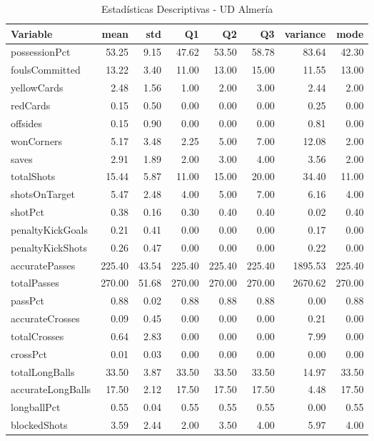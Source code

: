 \begin{table}[H]
\centering
\caption{Estadísticas Descriptivas - UD Almería}
\label{tab:esp_almeria}
\small
\begin{tabular}{lrrrrrrr}
\hline
Variable & mean & std & Q1 & Q2 & Q3 & variance & mode \\
\hline
possessionPct & 53.25 & 9.15 & 47.62 & 53.50 & 58.78 & 83.64 & 42.30 \\
foulsCommitted & 13.22 & 3.40 & 11.00 & 13.00 & 15.00 & 11.55 & 13.00 \\
yellowCards & 2.48 & 1.56 & 1.00 & 2.00 & 3.00 & 2.44 & 2.00 \\
redCards & 0.15 & 0.50 & 0.00 & 0.00 & 0.00 & 0.25 & 0.00 \\
offsides & 0.15 & 0.90 & 0.00 & 0.00 & 0.00 & 0.81 & 0.00 \\
wonCorners & 5.17 & 3.48 & 2.25 & 5.00 & 7.00 & 12.08 & 2.00 \\
saves & 2.91 & 1.89 & 2.00 & 3.00 & 4.00 & 3.56 & 2.00 \\
totalShots & 15.44 & 5.87 & 11.00 & 15.00 & 20.00 & 34.40 & 11.00 \\
shotsOnTarget & 5.47 & 2.48 & 4.00 & 5.00 & 7.00 & 6.16 & 4.00 \\
shotPct & 0.38 & 0.16 & 0.30 & 0.40 & 0.40 & 0.02 & 0.40 \\
penaltyKickGoals & 0.21 & 0.41 & 0.00 & 0.00 & 0.00 & 0.17 & 0.00 \\
penaltyKickShots & 0.26 & 0.47 & 0.00 & 0.00 & 0.00 & 0.22 & 0.00 \\
accuratePasses & 225.40 & 43.54 & 225.40 & 225.40 & 225.40 & 1895.53 & 225.40 \\
totalPasses & 270.00 & 51.68 & 270.00 & 270.00 & 270.00 & 2670.62 & 270.00 \\
passPct & 0.88 & 0.02 & 0.88 & 0.88 & 0.88 & 0.00 & 0.88 \\
accurateCrosses & 0.09 & 0.45 & 0.00 & 0.00 & 0.00 & 0.21 & 0.00 \\
totalCrosses & 0.64 & 2.83 & 0.00 & 0.00 & 0.00 & 7.99 & 0.00 \\
crossPct & 0.01 & 0.03 & 0.00 & 0.00 & 0.00 & 0.00 & 0.00 \\
totalLongBalls & 33.50 & 3.87 & 33.50 & 33.50 & 33.50 & 14.97 & 33.50 \\
accurateLongBalls & 17.50 & 2.12 & 17.50 & 17.50 & 17.50 & 4.48 & 17.50 \\
longballPct & 0.55 & 0.04 & 0.55 & 0.55 & 0.55 & 0.00 & 0.55 \\
blockedShots & 3.59 & 2.44 & 2.00 & 3.50 & 4.00 & 5.97 & 4.00 \\

\end{tabular}
\end{table}
